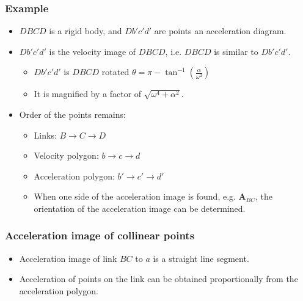 \documentclass[11pt]{article}
\begin{document}
\subsubsection{Example}
\label{sec:orgc416a21}
\begin{itemize}
\item \(DBCD\) is a rigid body, and \(Db'c'd'\) are points an acceleration diagram.
\item \(Db'c'd'\) is the velocity image of \(DBCD\), i.e. \(DBCD\) is similar to \(Db'c'd'\).
\begin{itemize}
\item \(Db'c'd'\) is \(DBCD\) rotated \(\theta = \pi - \tan^{-1} \left(\frac{\alpha}{\omega^2} \right)\)
\item It is magnified by a factor of \(\sqrt{\omega^4 + \alpha^2}\).
\end{itemize}
\item Order of the points remains:
\begin{itemize}
\item Links: \(B \rightarrow C \rightarrow D\)
\item Velocity polygon: \(b \rightarrow c \rightarrow d\)
\item Acceleration polygon: \(b' \rightarrow c' \rightarrow d'\)
\item When one side of the acceleration image is found, e.g. \(\boldsymbol{A}_{BC}\), the orientation of the acceleration image can be determined.
\end{itemize}
\end{itemize}
\subsubsection{Acceleration image of collinear points}
\label{sec:org99f6d3f}
\begin{itemize}
\item Acceleration image of link \(BC\) to \(a\) is a straight line segment.
\item Acceleration of points on the link can be obtained proportionally from the acceleration polygon.
\end{itemize}
\end{document}
